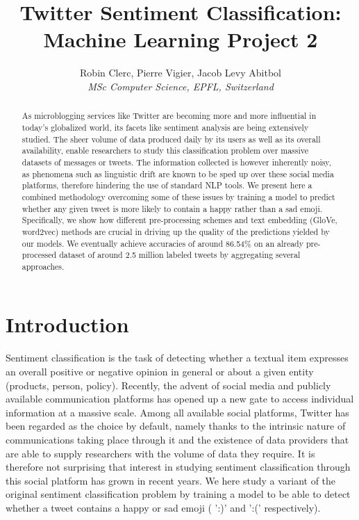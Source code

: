 \documentclass[10pt,conference,compsocconf,retainorgcmds]{IEEEtran}
\begin{document}
\title{Twitter Sentiment Classification: Machine Learning Project 2}

\author{
  Robin Clerc, Pierre Vigier, Jacob Levy Abitbol\\
  \textit{MSc  Computer Science, EPFL, Switzerland}
}

\maketitle

\begin{abstract}
As microblogging services like Twitter are becoming
more and more influential in today’s globalized world, its facets
like sentiment analysis are being extensively studied. The sheer volume of data produced daily by its users as well as its overall availability, enable researchers to study this classification problem over massive datasets of messages or tweets. The information collected is however inherently noisy, as phenomena such as linguistic drift are known to be sped up over these social media platforms, therefore hindering the use of standard NLP tools. We present here a combined methodology overcoming some of these issues by training a model to predict whether any given tweet is more likely to contain a happy rather than a sad emoji. Specifically, we show how different pre-processing schemes and text embedding (GloVe, word2vec) methods are crucial in driving up the quality of the  predictions yielded by our models. We eventually achieve accuracies of around 86.54\% on an already pre-processed dataset of around 2.5 million labeled tweets by aggregating several approaches.
\end{abstract}








\section{Introduction}
Sentiment classification is the task of detecting whether a textual item expresses an overall positive or negative opinion in general or about a given entity (products, person, policy).
Recently, the advent of social media and publicly available communication platforms has opened up a new gate to access individual information at a massive scale. Among all available social platforms, Twitter has been regarded as the choice by default, namely thanks to the intrinsic nature of communications taking place through it and the existence of data providers that are able to supply researchers with the volume of data they require. It is therefore not surprising that interest in studying sentiment classification through this social platform has grown in recent years. We here study a variant of the original sentiment classification problem by training a model to be able to detect whether a tweet contains  a  happy or sad emoji ( ':)' and  ':('   respectively).
\end{document}
